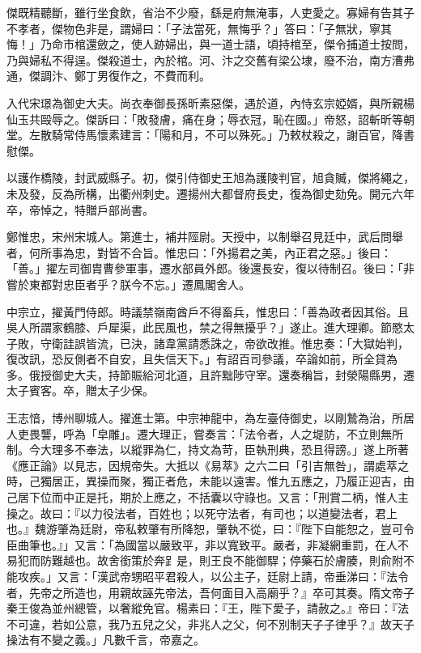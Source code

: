 \begin{pinyinscope}
 傑既精聽斷，雖行坐食飲，省治不少廢，繇是府無淹事，人吏愛之。寡婦有告其子不孝者，傑物色非是，謂婦曰：「子法當死，無悔乎？」答曰：「子無狀，寧其悔！」乃命市棺還斂之，使人跡婦出，與一道士語，頃持棺至，傑令捕道士按問，乃與婦私不得逞。傑殺道士，內於棺。河、汴之交舊有梁公埭，廢不治，南方漕弗通，傑調汴、鄭丁男復作之，不費而利。



 入代宋璟為御史大夫。尚衣奉御長孫昕素惡傑，遇於道，內恃玄宗婭婿，與所親楊仙玉共毆辱之。傑訴曰：「敗發膚，痛在身；辱衣冠，恥在國。」帝怒，詔斬昕等朝堂。左散騎常侍馬懷素建言：「陽和月，不可以殊死。」乃敕杖殺之，謝百官，降書慰傑。



 以護作橋陵，封武威縣子。初，傑引侍御史王旭為護陵判官，旭貪贓，傑將繩之，未及發，反為所構，出衢州刺史。遷揚州大都督府長史，復為御史劾免。開元六年卒，帝悼之，特贈戶部尚書。



 鄭惟忠，宋州宋城人。第進士，補井陘尉。天授中，以制舉召見廷中，武后問舉者，何所事為忠，對皆不合旨。惟忠曰：「外揚君之美，內正君之惡。」後曰：「善。」擢左司御胄曹參軍事，遷水部員外郎。後還長安，復以待制召。後曰：「非嘗於東都對忠臣者乎？朕今不忘。」遷鳳閣舍人。



 中宗立，擢黃門侍郎。時議禁嶺南酋戶不得畜兵，惟忠曰：「善為政者因其俗。且吳人所謂家鶴膝、戶犀渠，此民風也，禁之得無擾乎？」遂止。進大理卿。節愍太子敗，守衛詿誤皆流，已決，諸韋黨請悉誅之，帝欲改推。惟忠奏：「大獄始判，復改訊，恐反側者不自安，且失信天下。」有詔百司參議，卒論如前，所全貸為多。俄授御史大夫，持節賑給河北道，且許黜陟守宰。還奏稱旨，封滎陽縣男，遷太子賓客。卒，贈太子少保。



 王志愔，博州聊城人。擢進士第。中宗神龍中，為左臺侍御史，以剛鷙為治，所居人吏畏讋，呼為「皁雕」。遷大理正，嘗奏言：「法令者，人之堤防，不立則無所制。今大理多不奉法，以縱罪為仁，持文為苛，臣執刑典，恐且得謗。」遂上所著《應正論》以見志，因規帝失。大抵以《易萃》之六二曰「引吉無咎」，謂處萃之時，己獨居正，異操而聚，獨正者危，未能以遠害。惟九五應之，乃履正迎吉，由己居下位而中正是托，期於上應之，不括囊以守祿也。又言：「刑賞二柄，惟人主操之。故曰：『以力役法者，百姓也；以死守法者，有司也；以道變法者，君上也。』魏游肇為廷尉，帝私敕肇有所降恕，肇執不從，曰：『陛下自能恕之，豈可令臣曲筆也。』」又言：「為國當以嚴致平，非以寬致平。嚴者，非凝網重罰，在人不易犯而防難越也。故舍銜策於奔𧾷是，則王良不能御駻；停藥石於膚腠，則俞附不能攻疾。」又言：「漢武帝甥昭平君殺人，以公主子，廷尉上請，帝垂涕曰：『法令者，先帝之所造也，用親故誣先帝法，吾何面目入高廟乎？』卒可其奏。隋文帝子秦王俊為並州總管，以奢縱免官。楊素曰：『王，陛下愛子，請赦之。』帝曰：『法不可違，若如公意，我乃五兒之父，非兆人之父，何不別制天子子律乎？』故天子操法有不變之義。」凡數千言，帝嘉之。




\end{pinyinscope}
